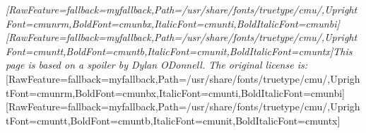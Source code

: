 {\itshape \allowbreak{}\setmainfont{cmunti.ttf}[RawFeature={fallback=myfallback},Path=/usr/share/fonts/truetype/cmu/,UprightFont=cmunrm,BoldFont=cmunbx,ItalicFont=cmunti,BoldItalicFont=cmunbi]\setmonofont{cmunti.ttf}[RawFeature={fallback=myfallback},Path=/usr/share/fonts/truetype/cmu/,UprightFont=cmuntt,BoldFont=cmuntb,ItalicFont=cmunit,BoldItalicFont=cmuntx]\itshape This page is based on a spoiler by Dylan O\textquotesingle{}Donnell\footnotemark[124]. The original license is:}\allowbreak{}\setmainfont{cmunrm.ttf}[RawFeature={fallback=myfallback},Path=/usr/share/fonts/truetype/cmu/,UprightFont=cmunrm,BoldFont=cmunbx,ItalicFont=cmunti,BoldItalicFont=cmunbi]\setmonofont{cmunrm.ttf}[RawFeature={fallback=myfallback},Path=/usr/share/fonts/truetype/cmu/,UprightFont=cmuntt,BoldFont=cmuntb,ItalicFont=cmunit,BoldItalicFont=cmuntx]











